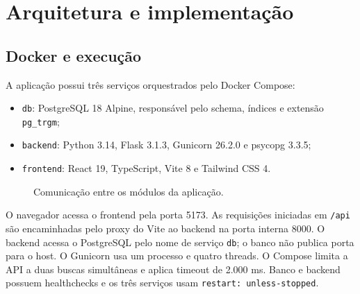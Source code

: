 \documentclass[12pt]{article}
\newcommand{\code}[1]{\texttt{#1}}
\begin{document}
\section{Arquitetura e implementação}

\subsection{Docker e execução}

A aplicação possui três serviços orquestrados pelo Docker Compose:

\begin{itemize}
  \item \code{db}: PostgreSQL 18 Alpine, responsável pelo schema, índices e
  extensão \code{pg\_trgm};
  \item \code{backend}: Python 3.14, Flask 3.1.3, Gunicorn 26.2.0 e psycopg
  3.3.5;
  \item \code{frontend}: React 19, TypeScript, Vite 8 e Tailwind CSS 4.
\end{itemize}

\begin{figure}[ht]
\centering
{}
\caption{Comunicação entre os módulos da aplicação.}
\label{fig:arquitetura}
\end{figure}

O navegador acessa o frontend pela porta 5173. As requisições iniciadas em
\code{/api} são encaminhadas pelo proxy do Vite ao backend na porta interna
8000. O backend acessa o PostgreSQL pelo nome de serviço \code{db}; o banco não
publica porta para o host. O Gunicorn usa um processo e quatro threads. O
Compose limita a API a duas buscas simultâneas e aplica timeout de 2.000 ms.
Banco e backend possuem healthchecks e os três serviços usam
\code{restart: unless-stopped}.
\end{document}
